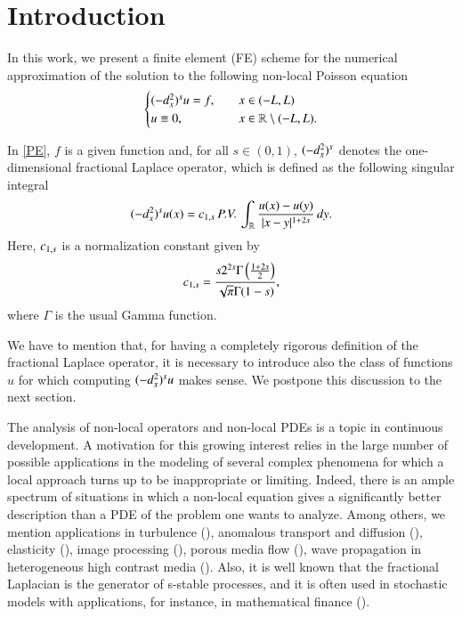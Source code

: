 \section{Introduction}\label{intro_sec}

In this work, we present a finite element (FE) scheme for the numerical approximation of the solution to the following non-local Poisson equation
\begin{align}\label{PE}
	\begin{cases}
		(-d_x^2)^{s}u = f, \quad & x\in(-L,L)
		\\
		u\equiv 0, & x\in\mathbb{R}\setminus(-L,L).
	\end{cases}
\end{align}

In \eqref{PE}, $f$ is a given function and, for all $s\in(0,1)$, $(-d_x^2)^{s}$ denotes the one-dimensional fractional Laplace operator, which is defined as the following singular integral
\begin{align*}
	(-d_x^2)^{s}u(x) = c_{1,s}\,P.V.\,\int_{\mathbb{R}}\frac{u(x)-u(y)}{|x-y|^{1+2s}}\,dy. 
\end{align*}
Here, $c_{1,s}$ is a normalization constant given by
\begin{align*}
	c_{1,s} = \frac{s2^{2s}\Gamma\left(\frac{1+2s}{2}\right)}{\sqrt{\pi}\Gamma(1-s)},
\end{align*}
where $\Gamma$ is the usual Gamma function. 

We have to mention that, for having a completely rigorous definition of the fractional Laplace operator, it is necessary to introduce also the class of functions $u$ for which computing $(-d_x^2)^{s}u$ makes sense. We postpone this discussion to the next section.

The analysis of non-local operators and non-local PDEs is a topic in continuous development.
A motivation for this growing interest relies in the large number of possible applications in the modeling of several complex phenomena for which a local approach turns up to be inappropriate or limiting.
Indeed, there is an ample spectrum of situations in which a non-local equation gives a
significantly better description than a PDE of the problem one wants to analyze.
Among others, we mention applications in turbulence (\cite{bakunin2008turbulence}), anomalous transport and diffusion (\cite{bologna2000anomalous,meerschaert2012fractional}), elasticity (\cite{dipierro2015dislocation}), image processing (\cite{gilboa2008nonlocal}), porous media flow (\cite{vazquez2012nonlinear}), wave propagation in heterogeneous high contrast media (\cite{zhu2014modeling}). Also, it is well known that the fractional Laplacian is the generator of s-stable processes, and it is often used in stochastic models with applications, for instance, in mathematical finance (\cite{levendorskii2004pricing,pham1997optimal}).

